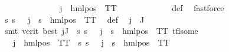 \begin{isabellebody}
\ \ \ \ \ \ \ \ \isamarkupfalse%
\ \isamarkupfalse%
\ {\isasymalpha}\ \ {\isachardoublequoteopen}{\isasymPsi}\ j\ {\isacharequal}{\kern0pt}\ hml{\isacharunderscore}{\kern0pt}pos\ {\isasymalpha}\ TT{\isachardoublequoteclose}\ \isanewline
\ \ \ \ \ \ \ \ \ \ \isamarkupfalse%
\ {\isasymPsi}{\isacharunderscore}{\kern0pt}def\ \isamarkupfalse%
\ fastforce\isanewline
\ \ \ \ \ \ \ \ \isamarkupfalse%
\ {\isachardoublequoteopen}{\isacharparenleft}{\kern0pt}{\isasymforall}s{\isachardot}{\kern0pt}\ {\isacharparenleft}{\kern0pt}s\ {\isasymTurnstile}\ {\isacharparenleft}{\kern0pt}{\isasymPhi}\ j{\isacharparenright}{\kern0pt}{\isacharparenright}{\kern0pt}\ {\isasymlongleftrightarrow}\ {\isacharparenleft}{\kern0pt}s\ {\isasymTurnstile}\ {\isacharparenleft}{\kern0pt}hml{\isacharunderscore}{\kern0pt}pos\ {\isasymalpha}\ TT{\isacharparenright}{\kern0pt}{\isacharparenright}{\kern0pt}{\isacharparenright}{\kern0pt}{\isachardoublequoteclose}\ \isamarkupfalse%
\ {\isasymPsi}{\isacharunderscore}{\kern0pt}def\ \isamarkupfalse%
\ {\isacartoucheopen}j\ {\isasymin}\ J{\isacartoucheclose}\ \isanewline
\ \ \ \ \ \ \ \ \ \ \isamarkupfalse%
\ {\isacharparenleft}{\kern0pt}smt\ {\isacharparenleft}{\kern0pt}verit{\isacharcomma}{\kern0pt}\ best{\isacharparenright}{\kern0pt}\ {\isacartoucheopen}{\isasymforall}j{\isasymin}J{\isachardot}{\kern0pt}\ {\isasymexists}{\isasymalpha}{\isachardot}{\kern0pt}\ {\isasymforall}s{\isachardot}{\kern0pt}\ {\isacharparenleft}{\kern0pt}s\ {\isasymTurnstile}\ {\isasymPhi}\ j{\isacharparenright}{\kern0pt}\ {\isacharequal}{\kern0pt}\ {\isacharparenleft}{\kern0pt}s\ {\isasymTurnstile}\ hml{\isacharunderscore}{\kern0pt}pos\ {\isasymalpha}\ TT{\isacharparenright}{\kern0pt}{\isacartoucheclose}\ tfl{\isacharunderscore}{\kern0pt}some{\isacharparenright}{\kern0pt}\isanewline
\ \ \ \ \ \ \ \ \isamarkupfalse%
\ \isamarkupfalse%
\ {\isachardoublequoteopen}{\isasymexists}{\isasymalpha}{\isachardot}{\kern0pt}\ {\isasymPsi}\ j\ {\isacharequal}{\kern0pt}\ hml{\isacharunderscore}{\kern0pt}pos\ {\isasymalpha}\ TT\ {\isasymand}\ {\isacharparenleft}{\kern0pt}{\isasymforall}s{\isachardot}{\kern0pt}\ {\isacharparenleft}{\kern0pt}s\ {\isasymTurnstile}\ {\isasymPhi}\ j{\isacharparenright}{\kern0pt}\ {\isacharequal}{\kern0pt}\ {\isacharparenleft}{\kern0pt}s\ {\isasymTurnstile}\ hml{\isacharunderscore}{\kern0pt}pos\ {\isasymalpha}\ TT{\isacharparenright}{\kern0pt}{\isacharparenright}{\kern0pt}{\isachardoublequoteclose}\isanewline

\end{isabellebody}
